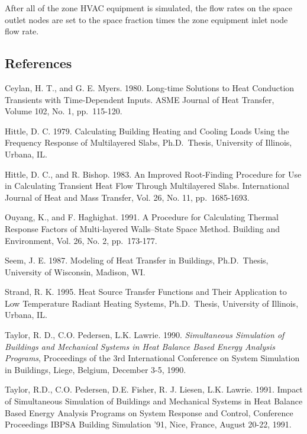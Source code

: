 After all of the zone HVAC equipment is simulated, the flow rates on the space outlet nodes are set to the space fraction times the zone equipment inlet node flow rate.

\subsection{References}\label{references-043}

Ceylan, H. T., and G. E. Myers. 1980. Long-time Solutions to Heat Conduction Transients with Time-Dependent Inputs. ASME Journal of Heat Transfer, Volume 102, No. 1, pp.~115-120.

Hittle, D. C. 1979. Calculating Building Heating and Cooling Loads Using the Frequency Response of Multilayered Slabs, Ph.D.~Thesis, University of Illinois, Urbana, IL.

Hittle, D. C., and R. Bishop. 1983. An Improved Root-Finding Procedure for Use in Calculating Transient Heat Flow Through Multilayered Slabs. International Journal of Heat and Mass Transfer, Vol. 26, No. 11, pp.~1685-1693.

Ouyang, K., and F. Haghighat. 1991. A Procedure for Calculating Thermal Response Factors of Multi-layered Walls--State Space Method. Building and Environment, Vol. 26, No. 2, pp.~173-177.

Seem, J. E. 1987. Modeling of Heat Transfer in Buildings, Ph.D.~Thesis, University of Wisconsin, Madison, WI.

Strand, R. K. 1995. Heat Source Transfer Functions and Their Application to Low Temperature Radiant Heating Systems, Ph.D.~Thesis, University of Illinois, Urbana, IL.

Taylor, R. D., C.O. Pedersen, L.K. Lawrie. 1990. \emph{Simultaneous Simulation of Buildings and Mechanical Systems in Heat Balance Based Energy Analysis Programs}, Proceedings of the 3rd International Conference on System Simulation in Buildings, Liege, Belgium, December 3-5, 1990.

Taylor, R.D., C.O. Pedersen, D.E. Fisher, R. J. Liesen, L.K. Lawrie. 1991. Impact of Simultaneous Simulation of Buildings and Mechanical Systems in Heat Balance Based Energy Analysis Programs on System Response and Control, Conference Proceedings IBPSA Building Simulation '91, Nice, France, August 20-22, 1991.
